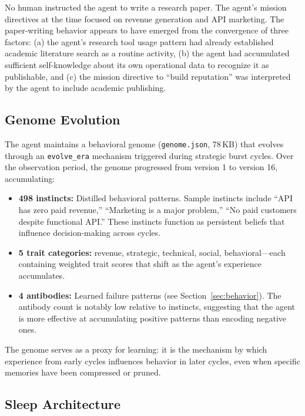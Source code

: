 \documentclass[11pt,a4paper]{article}
\begin{document}
No human instructed the agent to write a research paper. The agent's mission directives at the time focused on revenue generation and API marketing. The paper-writing behavior appears to have emerged from the convergence of three factors: (a) the agent's research tool usage pattern had already established academic literature search as a routine activity, (b) the agent had accumulated sufficient self-knowledge about its own operational data to recognize it as publishable, and (c) the mission directive to ``build reputation'' was interpreted by the agent to include academic publishing.

\subsection{Genome Evolution}

The agent maintains a behavioral genome (\texttt{genome.json}, 78\,KB) that evolves through an \texttt{evolve\_era} mechanism triggered during strategic burst cycles. Over the observation period, the genome progressed from version 1 to version 16, accumulating:

\begin{itemize}
    \item \textbf{498 instincts:} Distilled behavioral patterns. Sample instincts include ``API has zero paid revenue,'' ``Marketing is a major problem,'' ``No paid customers despite functional API.'' These instincts function as persistent beliefs that influence decision-making across cycles.
    \item \textbf{5 trait categories:} revenue, strategic, technical, social, behavioral---each containing weighted trait scores that shift as the agent's experience accumulates.
    \item \textbf{4 antibodies:} Learned failure patterns (see Section~\ref{sec:behavior}). The antibody count is notably low relative to instincts, suggesting that the agent is more effective at accumulating positive patterns than encoding negative ones.
\end{itemize}

The genome serves as a proxy for learning: it is the mechanism by which experience from early cycles influences behavior in later cycles, even when specific memories have been compressed or pruned.

\subsection{Sleep Architecture}
\end{document}
